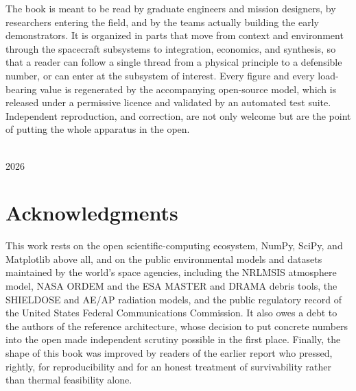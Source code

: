 The book is meant to be read by graduate engineers and mission designers, by researchers entering the
field, and by the teams actually building the early demonstrators. It is organized in parts that move
from context and environment through the spacecraft subsystems to integration, economics, and synthesis,
so that a reader can follow a single thread from a physical principle to a defensible number, or can
enter at the subsystem of interest. Every figure and every load-bearing value is regenerated by the
accompanying open-source model, which is released under a permissive licence and validated by an
automated test suite. Independent reproduction, and correction, are not only welcome but are the point of
putting the whole apparatus in the open.

\vspace{10pt}
\\
{\small\color{brandGray} 2026}
\clearpage

\chapter*{Acknowledgments}
This work rests on the open scientific-computing ecosystem, NumPy, SciPy, and Matplotlib above all, and
on the public environmental models and datasets maintained by the world's space agencies, including the
NRLMSIS atmosphere model, NASA ORDEM and the ESA MASTER and DRAMA debris tools, the SHIELDOSE and
AE/AP radiation models, and the public regulatory record of the United States Federal Communications
Commission. It also owes a debt to the authors of the reference architecture, whose decision to put
concrete numbers into the open made independent scrutiny possible in the first place. Finally, the shape
of this book was improved by readers of the earlier report who pressed, rightly, for reproducibility and
for an honest treatment of survivability rather than thermal feasibility alone.
\clearpage
